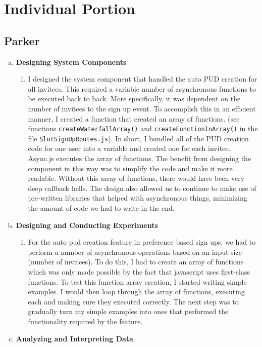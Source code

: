 \documentclass[11pt]{article}   %
\begin{document}
\section{Individual Portion}
\subsection*{Parker}

\begin{enumerate} [a)]
\item {\bf Designing System Components}
\begin{enumerate} [$\cdot$]
\item I designed the system component that handled the auto PUD creation for all invitees. This required a variable number of asynchronous functions to be executed back to back. More specifically, it was dependent on the number of invitees to the sign up event. To accomplish this in an efficient manner, I created a function that created an array of functions. (see functions \texttt{createWaterfallArray()} and \texttt{createFunctionInArray()} in the file \texttt{SlotSignUpRoutes.js}). In short, I bundled all of the PUD creation code for one user into a variable and created one for each invitee. Async.js executes the array of functions. The benefit from designing the component in this way was to simplify the code and make it more readable. Without this array of functions, there would have been very deep callback hells. The design also allowed us to continue to make use of pre-written libraries that helped with asynchronous things, minimizing the amount of code we had to write in the end.
\end{enumerate}
\item  {\bf Designing and Conducting Experiments}
\begin{enumerate} [$\cdot$]
\item For the auto pud creation feature in preference based sign ups, we had to perform a number of asynchronous operations based on an input size (number of invitees). To do this, I had to create an array of functions which was only made possible by the fact that javascript uses first-class functions. To test this function array creation, I started writing simple examples. I would then loop through the array of functions, executing each and making sure they executed correctly. The next step was to gradually turn my simple examples into ones that performed the functionality required by the feature. 
\end{enumerate}	
\item  {\bf Analyzing and Interpreting Data}

\end{enumerate}
\end{document}
